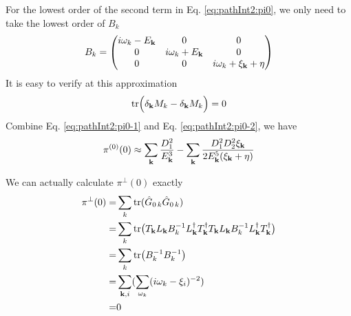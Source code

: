 For the lowest order of the second term in Eq. \eqref{eq:pathInt2:pi0}, we only need to take the lowest order of $B_{k}$
\begin{equation}
B_{k}=\begin{pmatrix}i\omega_{k}-E_{\mathbf{k}}&0&0\\0&i\omega_{k}+E_{\mathbf{k}}&0\\0&0&i\omega_{k}+\xi_{\mathbf{k}}+\eta\end{pmatrix}
\end{equation}
It is easy to verify at this approximation
\begin{equation}\label{eq:pathInt2:pi0-2}
\text{tr}\Big(\delta_{\mathbf{k}}M_{k}-\delta_{\mathbf{k}}M_{k}\Big)=0
\end{equation}
Combine Eq. \eqref{eq:pathInt2:pi0-1} and Eq. \eqref{eq:pathInt2:pi0-2}, we have 
\begin{equation}
\pi^{(0)}(0)\approx\sum_{\mathbf{k}}\frac{D_{1}^{2}}{E_{\mathbf{k}}^{3}}-\sum_{\mathbf{k}}\frac{D_{1}^{2}D_{2}^{2}\xi_{\mathbf{k}}}{2E_{\mathbf{k}}^{5}(\xi_{\mathbf{k}}+\eta)}\end{equation}

We can actually calculate  $\pi^{\perp}(0)$ exactly
\begin{equation}
\begin{split}
\pi^{\perp}(0)=&\sum_k\text{tr}(\hat{G}_{0\,k}\hat{G}_{0\,k})\\
	=&\sum_k\text{tr}\big(T_{\mathbf{k}}L_{\mathbf{k}}B_{k}^{-1}L_{\mathbf{k}}^{\dagger}T_{\mathbf{k}}^{\dagger}T_{\mathbf{k}}L_{\mathbf{k}}B_{k}^{-1}L_{\mathbf{k}}^{\dagger}T_{\mathbf{k}}^{\dagger}\big)\\
	=&\sum_k\text{tr}\big(B_{k}^{-1}B_{k}^{-1}\big)\\
	=&\sum_{\mathbf{k},i}(\sum_{\omega_{k}}(i\omega_{k}-\xi_{i})^{-2})\\
	=&0
\end{split}
\end{equation}


